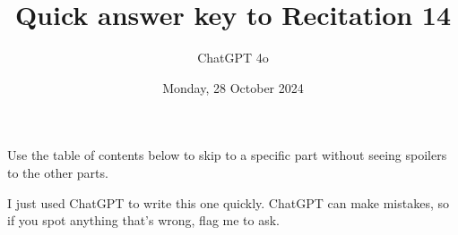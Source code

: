 \documentclass[11pt]{article}
\begin{document}
\title{Quick answer key to Recitation 14}
\author{ChatGPT 4o}
\date{Monday, 28 October 2024}
\maketitle

Use the table of contents below to skip to a specific part
without seeing spoilers to the other parts.

I just used ChatGPT to write this one quickly.
ChatGPT can make mistakes, so if you spot anything that's wrong, flag me to ask.

\tableofcontents
\end{document}

